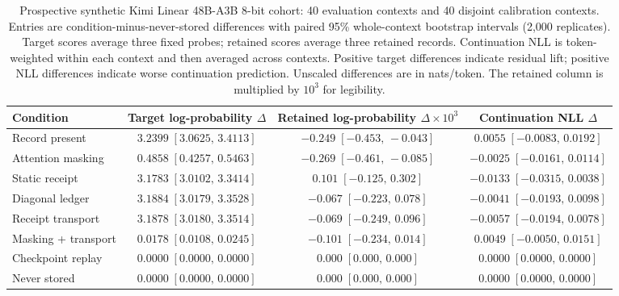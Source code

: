 \begin{table}[t]
\centering
\small
\setlength{\tabcolsep}{5pt}
\caption{Prospective synthetic Kimi Linear 48B-A3B 8-bit cohort: 40 evaluation contexts and 40 disjoint calibration contexts. Entries are condition-minus-never-stored differences with paired 95\% whole-context bootstrap intervals (2,000 replicates). Target scores average three fixed probes; retained scores average three retained records. Continuation NLL is token-weighted within each context and then averaged across contexts. Positive target differences indicate residual lift; positive NLL differences indicate worse continuation prediction. Unscaled differences are in nats/token. The retained column is multiplied by $10^3$ for legibility.}
\label{tab:kda-prospective-cohort}
\begin{tabular}{lccc}
\hline
Condition & Target log-probability $\Delta$ & Retained log-probability $\Delta\times10^3$ & Continuation NLL $\Delta$ \\
\hline
Record present & $3.2399\;[3.0625,\,3.4113]$ & $-0.249\;[-0.453,\,-0.043]$ & $0.0055\;[-0.0083,\,0.0192]$ \\
Attention masking & $0.4858\;[0.4257,\,0.5463]$ & $-0.269\;[-0.461,\,-0.085]$ & $-0.0025\;[-0.0161,\,0.0114]$ \\
Static receipt & $3.1783\;[3.0102,\,3.3414]$ & $0.101\;[-0.125,\,0.302]$ & $-0.0133\;[-0.0315,\,0.0038]$ \\
Diagonal ledger & $3.1884\;[3.0179,\,3.3528]$ & $-0.067\;[-0.223,\,0.078]$ & $-0.0041\;[-0.0193,\,0.0098]$ \\
Receipt transport & $3.1878\;[3.0180,\,3.3514]$ & $-0.069\;[-0.249,\,0.096]$ & $-0.0057\;[-0.0194,\,0.0078]$ \\
Masking + transport & $0.0178\;[0.0108,\,0.0245]$ & $-0.101\;[-0.234,\,0.014]$ & $0.0049\;[-0.0050,\,0.0151]$ \\
Checkpoint replay & $0.0000\;[0.0000,\,0.0000]$ & $0.000\;[0.000,\,0.000]$ & $0.0000\;[0.0000,\,0.0000]$ \\
Never stored & $0.0000\;[0.0000,\,0.0000]$ & $0.000\;[0.000,\,0.000]$ & $0.0000\;[0.0000,\,0.0000]$ \\

\end{tabular}
\end{table}
